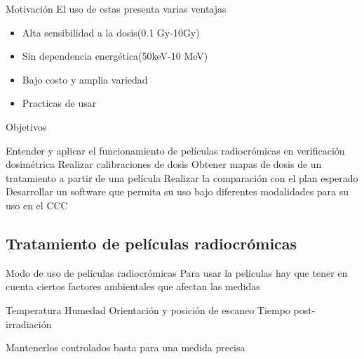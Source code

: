 \documentclass[12pt]{beamer}
\begin{document}


\begin{frame}{Motivación}
	El uso de estas presenta varias ventajas
	\begin{itemize}
		\item Alta sensibilidad a la dosis(0.1 Gy-10Gy)
		\item Sin dependencia energética(50keV-10 MeV)
		\item Bajo costo y amplia variedad
		\item Practicas de usar
	\end{itemize}
\end{frame}

\begin{frame}{Objetivos}
	\begin{outline}
		\1 Entender y aplicar el funcionamiento de películas radiocrómicas en verificación dosimétrica
		\2 Realizar calibraciones de dosis
		\2 Obtener mapas de dosis de un tratamiento a partir de una película
		\2 Realizar la comparación con el plan esperado
		\1 Desarrollar un software que permita su uso bajo diferentes modalidades para su uso en el CCC
	\end{outline}
\end{frame}


\subsection{Tratamiento de películas radiocrómicas}
\begin{frame}{Modo de uso de películas radiocrómicas}
Para usar la películas hay que tener en cuenta ciertos factores ambientales que afectan las medidas
	\begin{outline}
		\1 Temperatura
		\1 Humedad
		\1 Orientación y posición de escaneo
		\1 Tiempo post-irradiación
	\end{outline}
Mantenerlos controlados basta para una medida precisa
\end{frame}
\end{document}
